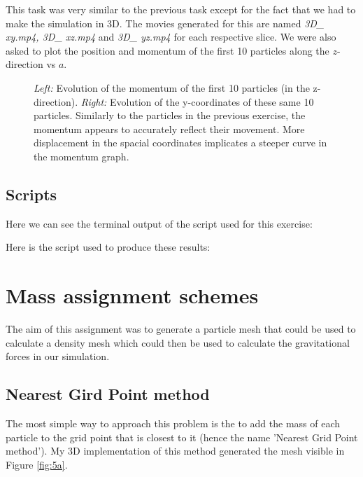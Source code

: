 \documentclass[a4paper,10pt]{article}
\begin{document}
This task was very similar to the previous task except for the fact that we had to make the simulation in 3D. The movies generated for this are named \textit{3D\_ xy.mp4, 3D\_ xz.mp4} and \textit{3D\_ yz.mp4} for each respective slice. We were also asked to plot the position and momentum of the first 10 particles along the $z$-direction vs $a$. 

\begin{figure}[h!] 
	\begin{center}
	\end{center}
	\captionsetup{width=0.8\linewidth}
	\vspace*{-7mm} %
	\caption{\textit{Left:} Evolution of the momentum of the first 10 particles (in the z-direction).  \textit{Right:} Evolution of the y-coordinates of these same 10 particles. Similarly to the particles in the previous exercise, the momentum appears to accurately reflect their movement. More displacement in the spacial coordinates implicates a steeper curve in the momentum graph.}
	\label{fig:4ab}
\end{figure}

\subsection{Scripts}

Here we can see the terminal output of the script used for this exercise:


Here is the script used to produce these results: 



\section{Mass assignment schemes}

The aim of this assignment was to generate a particle mesh that could be used to calculate a density mesh which could then be used to calculate the gravitational forces in our simulation. 

\subsection{Nearest Gird Point method}

The most simple way to approach this problem is the to add the mass of each particle to the grid point that is closest to it (hence the name 'Nearest Grid Point method'). My 3D implementation of this method generated the mesh visible in Figure \ref{fig:5a}. 
\end{document}
